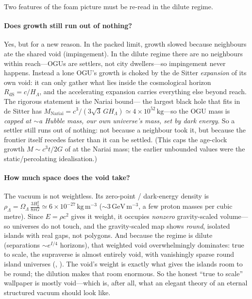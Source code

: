 Two features of the foam picture must be re-read in the dilute regime.

\paragraph{Does growth still run out of nothing?} Yes, but for a new reason. In the
packed limit, growth slowed because neighbours ate the shared void (impingement). In
the dilute regime there are no neighbours within reach---OGUs are settlers, not city
dwellers---so impingement never happens. Instead a lone OGU's growth is choked by the
de Sitter \emph{expansion} of its own void: it can only gather what lies inside the
cosmological horizon $R_{\mathrm{dS}}=c/H_\Lambda$, and the accelerating expansion
carries everything else beyond reach. The rigorous statement is the Nariai bound---
the largest black hole that fits in de Sitter has
$M_{\mathrm{Nariai}}=c^3/(3\sqrt3\,GH_\Lambda)\simeq4\times10^{52}\,\mathrm{kg}$---so
the OGU mass is \emph{capped at $\sim$a Hubble mass, our own universe's mass, set by
dark energy}. So a settler still runs out of nothing: not because a neighbour took
it, but because the frontier itself recedes faster than it can be settled. (This caps
the age-clock growth $M\sim c^3t/2G$ of  at the Nariai mass;
the earlier unbounded values were the static/percolating idealisation.)

\paragraph{How much space does the void take?} The vacuum is not weightless. Its
zero-point / dark-energy density is
$\rho_\Lambda=\Omega_\Lambda\,\tfrac{3H_0^2}{8\pi G}\simeq6\times10^{-27}\,
\mathrm{kg\,m^{-3}}$ ($\sim3\,\mathrm{GeV\,m^{-3}}$, a few proton masses per cubic
metre). Since $E=\rho c^2$ gives it weight, it occupies \emph{nonzero} gravity-scaled
volume---so universes do not touch, and the gravity-scaled map shows \emph{round},
isolated islands with real gaps, not polygons. And because the regime is dilute
(separations $\sim e^{I/4}$ horizons), that weighted void overwhelmingly dominates:
true to scale, the supraverse is almost entirely void, with vanishingly sparse round
island universes (, ). The void's weight is exactly
what gives the islands room to be round; the dilution makes that room enormous. So
the honest ``true to scale'' wallpaper is mostly void---which is, after all, what an
elegant theory of an eternal structured vacuum should look like.


